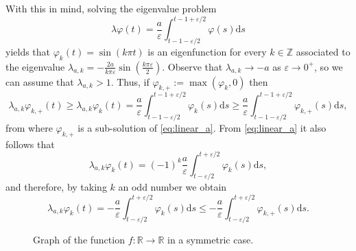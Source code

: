 \documentclass[a4paper,11pt]{article}
\theoremstyle{plain}
\theoremstyle{definition}
\theoremstyle{definition}
\newcommand{\R}{\mathbb{R}}
\newcommand{\Z}{\mathbb{Z}}
\newcommand{\dd}{\mathrm{d}}
\numberwithin{equation}{section}
\begin{document}
With this in mind, solving the eigenvalue problem
\begin{equation}\label{eq:linear_a}
    \lambda \varphi(t) = \frac{a}{\varepsilon} \int_{t-1-\varepsilon/2}^{t-1+\varepsilon/2} \varphi(s) \dd s
\end{equation}
yields that $\varphi_k(t) = \sin(k \pi t)$ is an eigenfunction for every $k\in\Z$ associated to the eigenvalue $\lambda_{a,k} = -\frac{2a}{k\pi\varepsilon} \sin\left( \frac{k \pi \varepsilon}{2} \right)$. Observe that $\lambda_{a,k}\to -a$ as $\varepsilon\to 0^+$, so we can assume that $\lambda_{a,k}>1$. Thus, if $\varphi_{k,+} := \max(\varphi_k,0)$ then
\[
    \lambda_{a,k} \varphi_{k,+}(t) \geq \lambda_{a,k} \varphi_k(t) = \frac{a}{\varepsilon} \int_{t-1-\varepsilon/2}^{t-1+\varepsilon/2} \varphi_k(s) \dd s \geq \frac{a}{\varepsilon} \int_{t-1-\varepsilon/2}^{t-1+\varepsilon/2} \varphi_{k,+}(s) \dd s,
\]
from where $\varphi_{k,+}$ is a sub-solution of \eqref{eq:linear_a}. From \eqref{eq:linear_a} it also follows that
\begin{equation}\label{eq:lambda_ak}
    \lambda_{a,k} \varphi_k(t) = (-1)^k\frac{a}{\varepsilon} \int_{t-\varepsilon/2}^{t+\varepsilon/2} \varphi_k(s) \dd s,
\end{equation}
and therefore, by taking $k$ an odd number we obtain
\begin{equation}\label{eq:subsolution}
    \lambda_{a,k} \varphi_k(t) = -\frac{a}{\varepsilon} \int_{t-\varepsilon/2}^{t+\varepsilon/2} \varphi_k(s) \dd s \leq -\frac{a}{\varepsilon} \int_{t-\varepsilon/2}^{t+\varepsilon/2} \varphi_{k,+}(s) \dd s.
\end{equation}

\begin{figure}[t]
    \centering
    \caption{Graph of the function $f\colon \R \to \R$ in a symmetric case.}
    \label{fig:4}
\end{figure}
\end{document}
